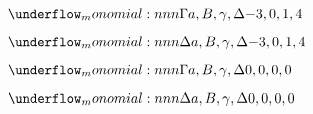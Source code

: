 \documentclass{article}
\begin{document}
$\monomial{ a, B, \gamma, \Delta }{ -3, 0, 1, 4 }$

$\monomial*{ a, B, \gamma, \Delta }{ -3, 0, 1, 4 }$

$\monomial{ a, B, \gamma, \Delta }{ 0, 0, 0, 0 }$

$\monomial*{ a, B, \gamma, \Delta }{ 0, 0, 0, 0 }$
\end{document}
